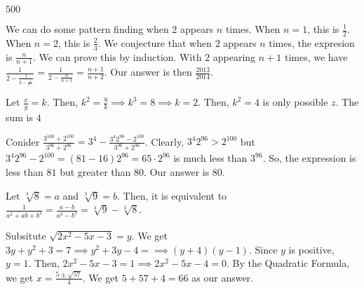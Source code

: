 \documentclass[11pt]{article}
\begin{document}
\begin{sol}
$\boxed{500}$
\end{sol}

\begin{sol}
We can do some pattern finding when $2$ appears $n$ times. When $n=1$, this is $\frac{1}{2}$. When $n=2$, this is $\frac{2}{3}$. We conjecture that when $2$ appears $n$ times, the expresion is $\frac{n}{n+1}$. We can prove this by induction. With $2$ appearing $n+1$ times, we have $\frac{1}{2-\frac{1}{2-\frac{1}{2\cdots}}} = \frac{1}{2-\frac{n}{n+1}}=\frac{n+1}{n+2}$. Our answer is then $\boxed{\frac{2013}{2014}}$.
\end{sol}


\begin{sol} 
Let $\frac{x}{y}=k$. Then, $k^2=\frac{8}{k}\implies k^3 = 8\implies k =2$. Then, $k^2=4$ is only possible $z$. The sum is $\boxed{4}$ 
\end{sol}


\begin{sol}
Conider $\frac{3^{100}+2^{100}}{3^{96}+2^{96}}=3^4-\frac{3^{4}2^{96}-2^{100}}{3^{96}+2^{96}}$. Clearly, $3^{4}2^{96}>2^{100}$ but $3^{4}2^{96}-2^{100}=(81-16)2^{96}=65\cdot 2^{96}$ is much less than $3^{96}$. So, the expression is less than $81$ but greater than $80$. Our answer is $\boxed{80}$.
\end{sol}


\begin{sol}
Let $\sqrt[3]{8}=a$ and $\sqrt[3]{9}=b$. Then, it is equivalent to $\frac{1}{a^2+ab+b^2}=\frac{a-b}{a^3-b^3}=\boxed{\sqrt[3]{9}-\sqrt[3]{8}}$.
\end{sol}


\begin{sol}
Subsitute $\sqrt{2x^2-5x-3}=y$. We get $3y+y^2+3=7\implies y^2+3y-4=\implies (y+4)(y-1)$. Since $y$ is positive, $y=1$. Then, $2x^2-5x-3=1\implies 2x^2-5x-4=0$. By the Quadratic Formula, we get $x=\frac{5 \pm \sqrt{57}}{4}$. We get $5+57+4=\boxed{66}$ as our answer.
\end{sol}
\end{document}
